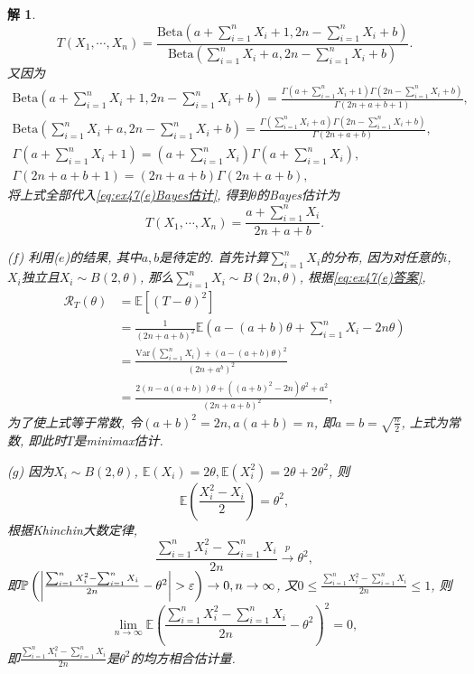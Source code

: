\documentclass[a4paper,oneside,12pt]{ctexart}
\theoremstyle{plain}
\theoremstyle{nonumberplain}
\newtheorem{solution}{解}
\theoremstyle{nonumberplain}
\newcommand{\cR}{\mathcal{R}}
\renewcommand{\epsilon}{\varepsilon}
\newcommand{\expect}{\mathbb{E}}
\newcommand{\Var}{\mathrm{Var}}
\newcommand{\prob}{\mathbb{P}}
\newcommand{\Beta}{\mathrm{Beta}}
\begin{document}
\begin{solution}
\begin{equation}
            T(X_1,\cdots,X_n)=\frac{\Beta\left(a+\sum_{i=1}^nX_i+1,2n-\sum_{i=1}^nX_i+b\right)}{\Beta\left(\sum_{i=1}^nX_i+a,2n-\sum_{i=1}^nX_i+b\right)}.
        \end{equation}
        又因为 
        \begin{gather*}
            \Beta\left(a+\sum_{i=1}^nX_i+1,2n-\sum_{i=1}^nX_i+b\right)=\frac{\Gamma(a+\sum_{i=1}^nX_i+1)\Gamma(2n-\sum_{i=1}^nX_i+b)}{\Gamma(2n+a+b+1)},\\
            \Beta\left(\sum_{i=1}^nX_i+a,2n-\sum_{i=1}^nX_i+b\right)=\frac{\Gamma(\sum_{i=1}^nX_i+a)\Gamma(2n-\sum_{i=1}^nX_i+b)}{\Gamma(2n+a+b)},\\
            \Gamma\left(a+\sum_{i=1}^nX_i+1\right)=\left(a+\sum_{i=1}^nX_i\right)\Gamma\left(a+\sum_{i=1}^nX_i\right),\\
            \Gamma(2n+a+b+1)=(2n+a+b)\Gamma(2n+a+b),
        \end{gather*}
        将上式全部代入\cref{eq:ex47(e)Bayes估计}, 得到$\theta$的Bayes估计为 
        \begin{equation}
            \label{eq:ex47(e)答案}
            T(X_1,\cdots,X_n)=\frac{a+\sum_{i=1}^nX_i}{2n+a+b}.
        \end{equation}

        ($f$) 利用($e$)的结果, 其中$a,b$是待定的. 首先计算$\sum_{i=1}^nX_i$的分布, 因为对任意的$i$, $X_i$独立且$X_i\sim B(2,\theta)$, 那么$\sum_{i=1}^nX_i\sim B(2n,\theta)$, 根据\cref{eq:ex47(e)答案}, 
        \begin{align*}
            \cR_T(\theta)&=\expect[(T-\theta)^2]\\
            &=\frac{1}{(2n+a+b)^2}\expect\left(a-(a+b)\theta+\sum_{i=1}^nX_i-2n\theta\right)\\
            &=\frac{\Var\left(\sum_{i=1}^nX_i\right)+(a-(a+b)\theta)^2}{(2n+a^b)^2}\\
            &=\frac{2(n-a(a+b))\theta+((a+b)^2-2n)\theta^2+a^2}{(2n+a+b)^2},
        \end{align*}
        为了使上式等于常数, 令$(a+b)^2=2n,a(a+b)=n$, 即$a=b=\sqrt{\frac{n}{2}}$, 上式为常数, 即此时$T$是minimax估计.

        ($g$) 因为$X_i\sim B(2,\theta)$, $\expect(X_i)=2\theta,\expect(X_i^2)=2\theta+2\theta^2$, 则
        \begin{equation*}
            \expect\left(\frac{X_i^2-X_i}{2}\right)=\theta^2,
        \end{equation*}
        根据Khinchin大数定律, 
        \begin{equation*}
            \frac{\sum_{i=1}^nX_i^2-\sum_{i=1}^nX_i}{2n}\overset{p}{\longrightarrow} \theta^2,
        \end{equation*}
        即$\prob\left(\abs{\frac{\sum_{i=1}^nX_i^2-\sum_{i=1}^nX_i}{2n}-\theta^2}>\epsilon\right)\to 0, n\to\infty$, 又$0\leqslant \frac{\sum_{i=1}^nX_i^2-\sum_{i=1}^nX_i}{2n}\leqslant 1$, 
        则\begin{equation*}
            \lim_{n\to\infty}\expect\left(\frac{\sum_{i=1}^nX_i^2-\sum_{i=1}^nX_i}{2n}-\theta^2\right)^2=0,
        \end{equation*}
        即$\frac{\sum_{i=1}^nX_i^2-\sum_{i=1}^nX_i}{2n}$是$\theta^2$的均方相合估计量.
    \end{solution}
\end{document}
